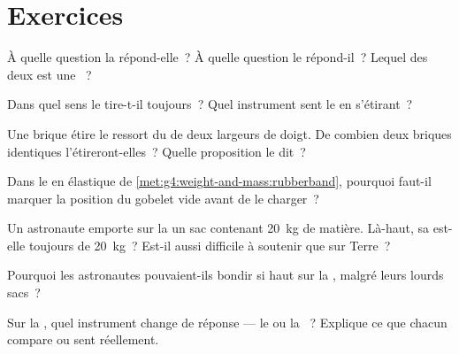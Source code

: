 \section{Exercices}

\begin{exercise}[$\star$]\label{exo:g4:weight-and-mass:1}
À quelle question la  répond-elle~? À quelle question le 
répond-il~? Lequel des deux est une ~?
\end{exercise}

\begin{exercise}[$\star$]\label{exo:g4:weight-and-mass:2}
Dans quel sens le  tire-t-il toujours~? Quel instrument sent le
 en s'étirant~?
\end{exercise}

\begin{exercise}[$\star$]\label{exo:g4:weight-and-mass:3}
Une brique étire le ressort du  de deux largeurs de
doigt. De combien deux briques identiques l'étireront-elles~? Quelle
proposition le dit~?
\end{exercise}

\begin{exercise}[$\star$]\label{exo:g4:weight-and-mass:4}
Dans le  en élastique de
\cref{met:g4:weight-and-mass:rubberband}, pourquoi faut-il marquer
la position du gobelet vide avant de le charger~?
\end{exercise}

\begin{exercise}[$\star$]\label{exo:g4:weight-and-mass:5}
Un astronaute emporte sur la  un sac contenant \qty{20}{kg} de
matière. Là-haut, sa  est-elle toujours de \qty{20}{kg}~?
Est-il aussi difficile à soutenir que sur Terre~?
\end{exercise}

\begin{exercise}[$\star$]\label{exo:g4:weight-and-mass:6}
Pourquoi les astronautes pouvaient-ils bondir si haut sur la ,
malgré leurs lourds sacs~?
\end{exercise}

\begin{exercise}[$\star$]\label{exo:g4:weight-and-mass:7}
Sur la , quel instrument change de réponse --- le  ou
la ~? Explique ce que chacun compare ou sent réellement.
\end{exercise}

